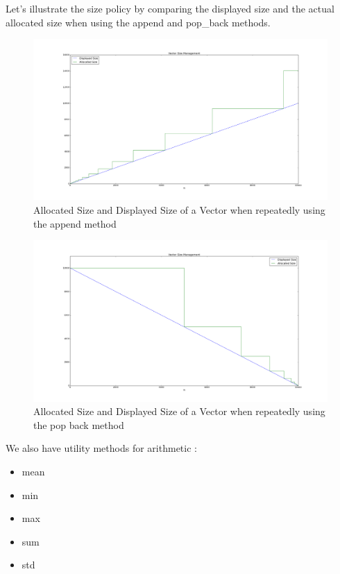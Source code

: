 \documentclass[a4paper]{report}
\begin{document}
Let's illustrate the size policy by comparing the displayed size and the actual allocated size when using the append and pop\_back methods.
\begin{figure}[H]
\begin{center}
\includegraphics[scale=0.21]{vector_size_append_alloc.png}\caption{Allocated Size and Displayed Size of a Vector when repeatedly using the append method}
\end{center}
\end{figure}
\begin{figure}[H]
\begin{center}
\includegraphics[scale=0.21]{vector_size_pop_back_alloc.png}\caption{Allocated Size and Displayed Size of a Vector when repeatedly using the pop back method}
\end{center}
\end{figure}
We also have utility methods for arithmetic : 
\begin{itemize}
\item mean
\item min
\item max
\item sum
\item std
\end{itemize}
\end{document}
